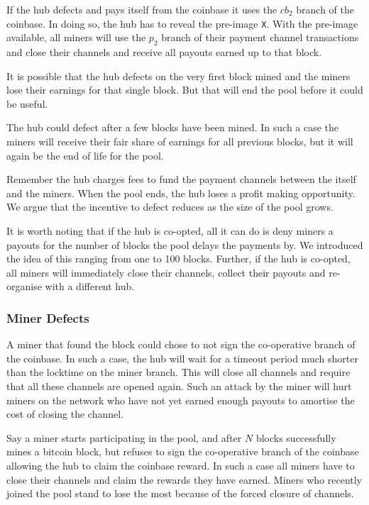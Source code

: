 \documentclass{article}
\begin{document}
If the hub defects and pays itself from the coinbase it uses the
$cb_2$ branch of the coinbase. In doing so, the hub has to reveal the
pre-image \verb|X|. With the pre-image available, all miners will use
the $p_2$ branch of their payment channel transactions and close their
channels and receive all payouts earned up to that block.

It is possible that the hub defects on the very first block mined and
the miners lose their earnings for that single block. But that will
end the pool before it could be useful.

The hub could defect after a few blocks have been mined. In such a
case the miners will receive their fair share of earnings for all
previous blocks, but it will again be the end of life for the pool.

Remember the hub charges fees to fund the payment channels between the
itself and the miners. When the pool ends, the hub loses a profit
making opportunity. We argue that the incentive to defect reduces as
the size of the pool grows.

It is worth noting that if the hub is co-opted, all it can do is deny
miners a payouts for the number of blocks the pool delays the payments
by. We introduced the idea of this ranging from one to 100
blocks. Further, if the hub is co-opted, all miners will immediately
close their channels, collect their payouts and re-organise with a
different hub.

\subsubsection{Miner Defects}\label{ref:miner-defects}

A miner that found the block could chose to not sign the co-operative
branch of the coinbase. In such a case, the hub will wait for a
timeout period much shorter than the locktime on the miner
branch. This will close all channels and require that all these
channels are opened again. Such an attack by the miner will hurt
miners on the network who have not yet earned enough payouts to
amortise the cost of closing the channel.

Say a miner starts participating in the pool, and after $N$ blocks
successfully mines a bitcoin block, but refuses to sign the
co-operative branch of the coinbase allowing the hub to claim the
coinbase reward. In such a case all miners have to close their
channels and claim the rewards they have earned. Miners who recently
joined the pool stand to lose the most because of the forced closure
of channels.
\end{document}
